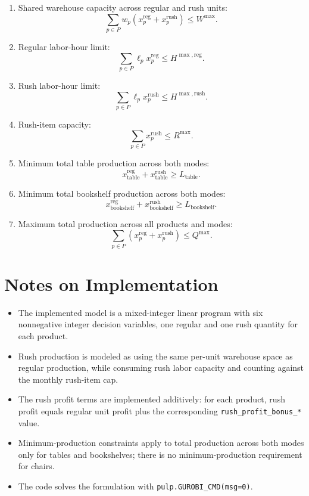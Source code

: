 \begin{enumerate}
    \item Shared warehouse capacity across regular and rush units:
    \[
    \sum_{p \in P} w_p \left(x_p^{\mathrm{reg}} + x_p^{\mathrm{rush}}\right) \le W^{\max}.
    \]

    \item Regular labor-hour limit:
    \[
    \sum_{p \in P} \ell_p x_p^{\mathrm{reg}} \le H^{\max,\mathrm{reg}}.
    \]

    \item Rush labor-hour limit:
    \[
    \sum_{p \in P} \ell_p x_p^{\mathrm{rush}} \le H^{\max,\mathrm{rush}}.
    \]

    \item Rush-item capacity:
    \[
    \sum_{p \in P} x_p^{\mathrm{rush}} \le R^{\max}.
    \]

    \item Minimum total table production across both modes:
    \[
    x_{\text{table}}^{\mathrm{reg}} + x_{\text{table}}^{\mathrm{rush}} \ge L_{\text{table}}.
    \]

    \item Minimum total bookshelf production across both modes:
    \[
    x_{\text{bookshelf}}^{\mathrm{reg}} + x_{\text{bookshelf}}^{\mathrm{rush}} \ge L_{\text{bookshelf}}.
    \]

    \item Maximum total production across all products and modes:
    \[
    \sum_{p \in P} \left(x_p^{\mathrm{reg}} + x_p^{\mathrm{rush}}\right) \le Q^{\max}.
    \]
\end{enumerate}

\section*{Notes on Implementation}

\begin{itemize}
    \item The implemented model is a mixed-integer linear program with six nonnegative integer decision variables, one regular and one rush quantity for each product.
    \item Rush production is modeled as using the same per-unit warehouse space as regular production, while consuming rush labor capacity and counting against the monthly rush-item cap.
    \item The rush profit terms are implemented additively: for each product, rush profit equals regular unit profit plus the corresponding \texttt{rush\_profit\_bonus\_*} value.
    \item Minimum-production constraints apply to total production across both modes only for tables and bookshelves; there is no minimum-production requirement for chairs.
    \item The code solves the formulation with \texttt{pulp.GUROBI\_CMD(msg=0)}.
\end{itemize}
